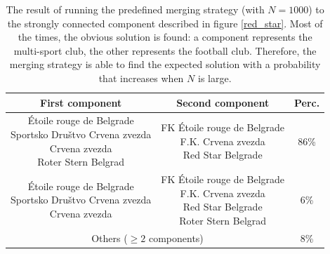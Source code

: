             \begin{table}[h]
                \centering
                \begin{tabular}{|c|c|c|}
                    \hline
                    First component & Second component & Perc. \\ \hline \hline
                    \makecell{Étoile rouge de Belgrade\\Sportsko Društvo Crvena zvezda\\Crvena zvezda\\Roter Stern Belgrad} & \makecell{FK Étoile rouge de Belgrade\\F.K. Crvena zvezda\\Red Star Belgrade} & 86\% \\ \hline
                    \makecell{Étoile rouge de Belgrade\\Sportsko Društvo Crvena zvezda\\Crvena zvezda} & \makecell{FK Étoile rouge de Belgrade\\F.K. Crvena zvezda\\Red Star Belgrade\\Roter Stern Belgrad} & 6\% \\ \hline
                    \multicolumn{2}{|c|}{Others (\(\ge 2\) components)} & 8\% \\ \hline
                \end{tabular}
                \caption{The result of running the predefined merging strategy (with \(N=1000\)) to the strongly connected component described in figure \ref{red_star}. Most of the times, the obvious solution is found: a component represents the multi-sport club, the other represents the football club. Therefore, the merging strategy is able to find the expected solution with a probability that increases when \(N\) is large.}
                \label{results_merging_red_star}
            \end{table}
            
